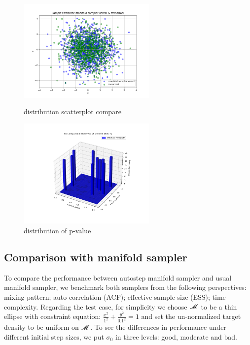 \documentclass{article}
\begin{document}
\begin{figure}[H]
    \centering
    \begin{minipage}{0.45\linewidth}
        \centering
        \includegraphics[width=0.6\textwidth, height=0.12\textheight]{scatter.png}
        \caption{distribution scatterplot compare}
        \label{fig:scatter}
    \end{minipage}
    \hspace{0.03\textwidth}
    \begin{minipage}{0.45\linewidth}
        \centering
        \includegraphics[width=0.6\textwidth, height=0.12\textheight]{pvals.png}
        \caption{distribution of p-value}
        \label{fig:pval}
    \end{minipage}   
\end{figure}





\subsection{Comparison with manifold sampler}
To compare the performance between autostep manifold sampler and usual manifold sampler, we benchmark both samplers from the following perspectives: mixing pattern; auto-correlation (ACF); effective sample size (ESS); time complexity. Regarding the test case, for simplicity we choose $\mathscr{M}$ to be a thin ellipse with constraint equation: $\frac{x^2}{1^2} + \frac{y^2}{0.1^2} = 1$ and set the un-normalized target density to be uniform on $\mathscr{M}$. To see the differences in performance under different initial step sizes, we put $\sigma_0$ in three levels: good, moderate and bad.
\end{document}
